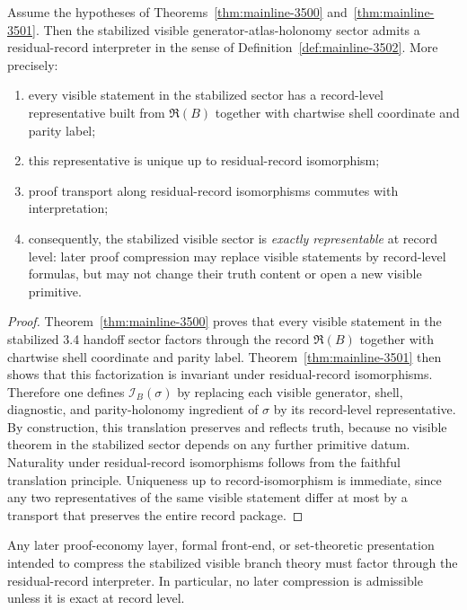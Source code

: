 \begin{theorem}
\label{thm:mainline-3502}
Assume the hypotheses of Theorems~\ref{thm:mainline-3500} and~\ref{thm:mainline-3501}. Then the stabilized visible generator-atlas-holonomy sector admits a residual-record interpreter in the sense of Definition~\ref{def:mainline-3502}. More precisely:
\begin{enumerate}[label=(\roman*), leftmargin=2em]
  \item every visible statement in the stabilized sector has a record-level representative built from $\mathfrak R(B)$ together with chartwise shell coordinate and parity label;
  \item this representative is unique up to residual-record isomorphism;
  \item proof transport along residual-record isomorphisms commutes with interpretation;
  \item consequently, the stabilized visible sector is \emph{exactly representable} at record level: later proof compression may replace visible statements by record-level formulas, but may not change their truth content or open a new visible primitive.
\end{enumerate}
\end{theorem}

\begin{proof}
Theorem~\ref{thm:mainline-3500} proves that every visible statement in the stabilized 3.4 handoff sector factors through the record $\mathfrak R(B)$ together with chartwise shell coordinate and parity label. Theorem~\ref{thm:mainline-3501} then shows that this factorization is invariant under residual-record isomorphisms. Therefore one defines $\mathcal I_B(\sigma)$ by replacing each visible generator, shell, diagnostic, and parity-holonomy ingredient of $\sigma$ by its record-level representative. By construction, this translation preserves and reflects truth, because no visible theorem in the stabilized sector depends on any further primitive datum. Naturality under residual-record isomorphisms follows from the faithful translation principle. Uniqueness up to record-isomorphism is immediate, since any two representatives of the same visible statement differ at most by a transport that preserves the entire record package.
\end{proof}

\begin{corollary}
\label{cor:mainline-3502}
Any later proof-economy layer, formal front-end, or set-theoretic presentation intended to compress the stabilized visible branch theory must factor through the residual-record interpreter. In particular, no later compression is admissible unless it is exact at record level.
\end{corollary}

